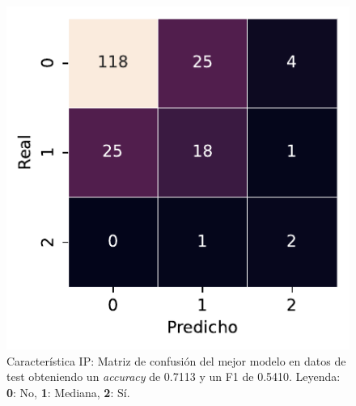\begin{figure}[htbp]
    \vspace{1.5em} %

    \includegraphics[width=0.6\linewidth]{figures/5_experiments/single-ip-cm.pdf}
    \caption[Característica IP: Matriz de confusión del mejor modelo en datos de test.]{Característica IP: Matriz de confusión del mejor modelo en datos de test obteniendo un \textit{accuracy} de 0.7113 y un F1 de 0.5410. Leyenda: \textbf{0}: No, \textbf{1}: Mediana, \textbf{2}: Sí.}
    \label{fig5:IP_confusion_matrix}
\end{figure}

